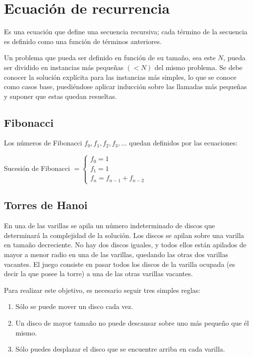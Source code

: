 \newpage
\section{Ecuación de recurrencia}
Es una ecuación que define una secuencia recursiva; cada término de la secuencia es definido como una función de términos anteriores.

Un problema que pueda ser definido en función de su tamaño, sea este $N$, pueda ser dividido en instancias más pequeñas $(< N)$ del mismo problema.
Se debe conocer la solución explícita para las instancias más simples, lo que se conoce como casos base, puediéndose aplicar inducción sobre las llamadas más pequeñas y suponer que estas quedan resueltas.

\subsection{Fibonacci}
Los números de Fibonacci $f_0,f_1,f_2,f_3,\dots$ quedan definidos por las ecuaciones:\\

\begin{center}
	Sucesión de Fibonacci $= \left\{ \begin{array}{c}
	f_0 = 1\\
	f_1 = 1\\
	f_n = f_{n-1} + f_{n-2}
	\end{array}\right.$
\end{center}

\subsection{Torres de Hanoi}
En una de las varillas se apila un número indeterminado de discos que determinará la complejidad de la solución.
Los discos se apilan sobre una varilla en tamaño decreciente. No hay dos discos iguales, y todos ellos están apilados de mayor a menor radio en una de las varillas, quedando las otras dos varillas vacantes. 
El juego consiste en pasar todos los discos de la varilla ocupada (es decir la que posee la torre) a una de las otras varillas vacantes. 

Para realizar este objetivo, es necesario seguir tres simples reglas:
\begin{enumerate}
	\item Sólo se puede mover un disco cada vez.
	\item Un disco de mayor tamaño no puede descansar sobre uno más pequeño que él mismo.
	\item Sólo puedes desplazar el disco que se encuentre arriba en cada varilla.
\end{enumerate}

